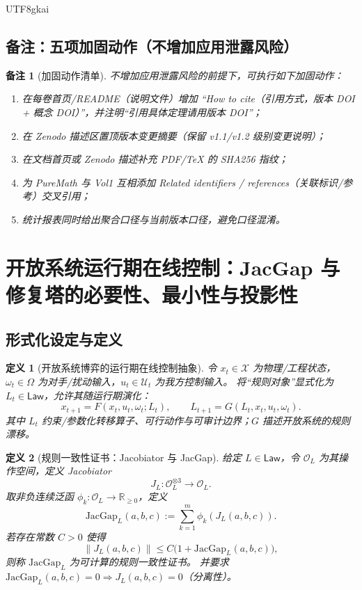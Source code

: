 \documentclass[12pt]{article}
\newtheorem{definition}{定义}[section]
\newtheorem{remark}{备注}[section]
\newcommand{\RR}{\mathbb{R}}
\newcommand{\JacGap}{\ensuremath{\mathrm{JacGap}}} %
\begin{document}
\begin{CJK*}{UTF8}{gkai}
\subsection{备注：五项加固动作（不增加应用泄露风险）}
\label{sec:zenodo-priority-remarks}

\begin{remark}[加固动作清单]
不增加应用泄露风险的前提下，可执行如下加固动作：
\begin{enumerate}
  \item 在每卷首页/README（说明文件）增加 “How to cite（引用方式，版本 DOI + 概念 DOI）”，并注明“引用具体定理请用版本 DOI”；
  \item 在 Zenodo 描述区置顶版本变更摘要（保留 v1.1/v1.2 级别变更说明）；
  \item 在文档首页或 Zenodo 描述补充 PDF/TeX 的 SHA256 指纹；
  \item 为 PureMath 与 Vol1 互相添加 Related identifiers / references（关联标识/参考）交叉引用；
  \item 统计报表同时给出聚合口径与当前版本口径，避免口径混淆。
\end{enumerate}
\end{remark}

\section{开放系统运行期在线控制：JacGap 与修复塔的必要性、最小性与投影性}
\label{sec:open-system-runtime-control}

\subsection{形式化设定与定义}
\label{sec:open-system-runtime-formalization}

\begin{definition}[开放系统博弈的运行期在线控制抽象]
令 $x_t\in\mathcal{X}$ 为物理/工程状态，$\omega_t\in\Omega$ 为对手/扰动输入，$u_t\in\mathcal{U}_t$ 为我方控制输入。
将“规则对象”显式化为 $L_t\in\mathsf{Law}$，允许其随运行期演化：
\[
  x_{t+1}=F(x_t,u_t,\omega_t;L_t),
  \qquad
  L_{t+1}=G(L_t,x_t,u_t,\omega_t).
\]
其中 $L_t$ 约束/参数化转移算子、可行动作与可审计边界；$G$ 描述开放系统的规则漂移。
\end{definition}

\begin{definition}[规则一致性证书：Jacobiator 与 JacGap]
给定 $L\in\mathsf{Law}$，令 $\mathcal{O}_L$ 为其操作空间，定义 Jacobiator
\[
  J_L:\mathcal{O}_L^{\otimes 3}\to\mathcal{O}_L.
\]
取非负连续泛函 $\phi_k:\mathcal{O}_L\to\RR_{\ge 0}$，定义
\[
  \JacGap_L(a,b,c):=\sum_{k=1}^m \phi_k(J_L(a,b,c)).
\]
若存在常数 $C>0$ 使得
\[
  \|J_L(a,b,c)\|\le C\bigl(1+\JacGap_L(a,b,c)\bigr),
\]
则称 $\JacGap_L$ 为可计算的规则一致性证书。
并要求 $\JacGap_L(a,b,c)=0\Rightarrow J_L(a,b,c)=0$（分离性）。
\end{definition}


\end{CJK*}
\end{document}

